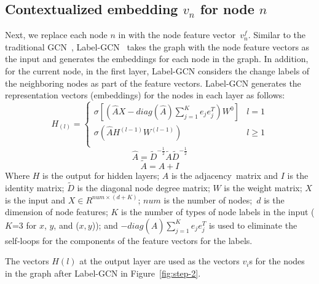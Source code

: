 \subsection{Contextualized embedding $v_n$ for node $n$}
\label{label-gcn-compute}

Next, we replace each node $n$ in {\mvpdgxy} with the node feature
vector~$v^{f}_n$.
Similar to the traditional GCN~\cite{gcn}, Label-GCN~\cite{label-gcn}
takes the graph with the node feature vectors as the input and
generates the embeddings for each node in the graph. In addition, for
the current node, in the first layer, Label-GCN considers the change
labels of the neighboring nodes as part of the feature vectors.
Label-GCN generates the representation vectors (embeddings) for the nodes in each
layer as follows:
\begin{equation}\label{eq1}
	H_{(l)} = 
	\begin{cases}
		\sigma [(\hat{A}X-diag(\hat{A})\sum_{j=1}^{K}e_je^T_j)W^0] &  l = 1\\
		\sigma (\hat{A}H^{(l-1)}W^{(l-1)}) &  l \geq 1\\
	\end{cases}
\end{equation}
\begin{equation}\label{eq2}
	\hat{A} = \tilde{D}^{-\frac{1}{2}}\tilde{A}\tilde{D}^{-\frac{1}{2}}
\end{equation}
\begin{equation}\label{eq3}
	\tilde{A} = A + I
\end{equation}
Where $H$ is the output for hidden layers; $A$ is the
adjacency~matrix and $I$ is the identity matrix; $\tilde{D}$ is the diagonal node degree matrix; $W$
is the weight matrix; $X$ is the input and $X \in R^{num \times (d+K)}$;
$num$ is the number of nodes;~$d$ is the dimension of node features;
$K$ is the number of types of node labels in the input ($K$=3 for $x$,
$y$, and ($x,y$)); and $-diag(\hat{A})\sum_{j=1}^{K}e_je^T_j$ is used
to eliminate the self-loops for the components of the feature vectors
for the labels.

The vectors $H(l)$ at the output layer are used as the vectors $v_i$s
for the nodes in the {\mvpdgxy} graph after Label-GCN in Figure~\ref{fig:step-2}.



